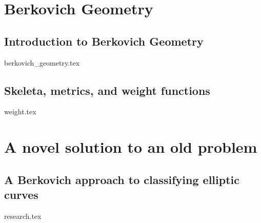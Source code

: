 \part{Berkovich Geometry}
\chapter{Introduction to Berkovich Geometry} \label{chap:intro_berkovich}
{berkovich_geometry.tex}


\chapter{Skeleta, metrics, and weight functions} \label{chap:weight_functions}
{weight.tex}

\part{A novel solution to an old problem}
\chapter{A Berkovich approach to classifying elliptic curves} \label{chap:a_berkovich_approach_to_classifying_elliptic_curves}
{research.tex}


\pagebreak
\printbibliography


